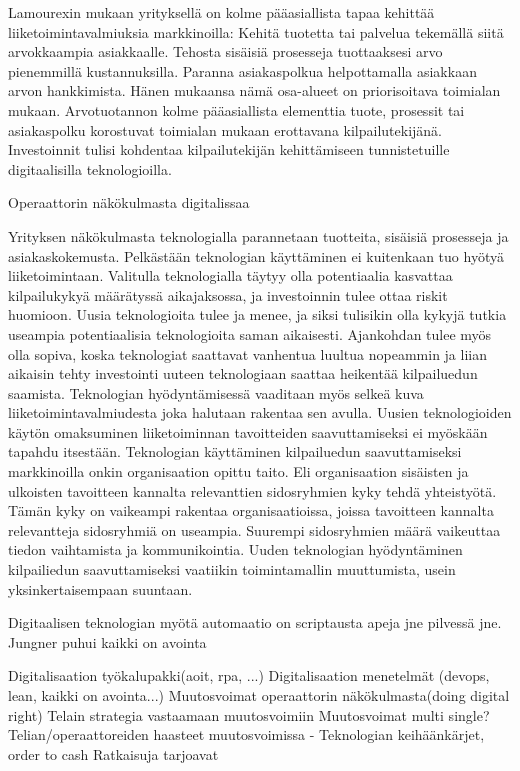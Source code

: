 \documentclass[finnish,12pt,a4paper,pdftex]{article}
\begin{document}
Lamourexin \citeyear{lamoureux} mukaan yrityksellä on kolme pääasiallista tapaa kehittää liiketoimintavalmiuksia markkinoilla: Kehitä tuotetta tai palvelua tekemällä siitä arvokkaampia asiakkaalle. Tehosta sisäisiä prosesseja tuottaaksesi arvo pienemmillä kustannuksilla. Paranna asiakaspolkua helpottamalla asiakkaan arvon hankkimista. Hänen mukaansa nämä osa-alueet on priorisoitava toimialan mukaan. Arvotuotannon kolme pääasiallista elementtia tuote, prosessit tai asiakaspolku korostuvat toimialan mukaan erottavana kilpailutekijänä. Investoinnit tulisi kohdentaa kilpailutekijän kehittämiseen tunnistetuille digitaalisilla teknologioilla.




Operaattorin näkökulmasta digitalissaa

Yrityksen näkökulmasta teknologialla parannetaan tuotteita, sisäisiä prosesseja ja asiakaskokemusta. Pelkästään teknologian käyttäminen ei kuitenkaan tuo hyötyä liiketoimintaan. Valitulla teknologialla täytyy olla potentiaalia kasvattaa kilpailukykyä määrätyssä aikajaksossa, ja investoinnin tulee ottaa riskit huomioon. Uusia teknologioita tulee ja menee, ja siksi tulisikin olla kykyjä tutkia useampia potentiaalisia teknologioita saman aikaisesti. Ajankohdan tulee myös olla sopiva, koska teknologiat saattavat vanhentua luultua nopeammin ja liian aikaisin tehty investointi uuteen teknologiaan saattaa heikentää kilpailuedun saamista. Teknologian hyödyntämisessä vaaditaan myös selkeä kuva liiketoimintavalmiudesta joka halutaan rakentaa sen avulla. Uusien teknologioiden käytön omaksuminen liiketoiminnan tavoitteiden saavuttamiseksi ei myöskään tapahdu itsestään. Teknologian käyttäminen kilpailuedun saavuttamiseksi markkinoilla onkin organisaation opittu taito. Eli organisaation sisäisten ja ulkoisten tavoitteen kannalta relevanttien sidosryhmien kyky tehdä yhteistyötä. Tämän kyky on vaikeampi rakentaa organisaatioissa, joissa tavoitteen kannalta relevantteja sidosryhmiä on useampia. Suurempi sidosryhmien määrä vaikeuttaa tiedon vaihtamista ja kommunikointia. Uuden teknologian hyödyntäminen kilpailiedun saavuttamiseksi vaatiikin toimintamallin muuttumista, usein yksinkertaisempaan suuntaan.





Digitaalisen teknologian myötä automaatio on scriptausta apeja jne pilvessä jne. Jungner puhui kaikki on avointa



Digitalisaation työkalupakki(aoit, rpa, ...)
Digitalisaation menetelmät (devops, lean, kaikki on avointa...)
Muutosvoimat operaattorin näkökulmasta(doing digital right)
Telain strategia vastaamaan muutosvoimiin
Muutosvoimat
multi single?
Telian/operaattoreiden haasteet muutosvoimissa
- Teknologian keihäänkärjet, order to cash
Ratkaisuja tarjoavat 
\end{document}
